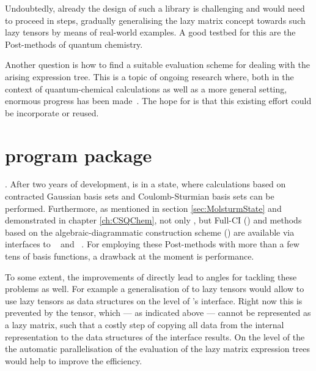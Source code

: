 Undoubtedly, already the design of such a library is challenging
and would need to proceed in steps,
gradually generalising the lazy matrix concept towards
such lazy tensors
by means of real-world examples.
A good testbed for this are the Post-\HF methods of quantum chemistry.

Another question is how to find a suitable evaluation
scheme for dealing with the arising expression tree.
This is a topic of ongoing research
where, both in the context of quantum-chemical calculations
as well as a more general setting,
enormous progress has been made~\cite{Baumgartner2005,Solomonik2014,%
Peise2015,Calvin2015,Calvin2015arxiv,Xerus,Kristensen2016array,%
Kristensen2016streaming,Libtensor}.
The hope for \lazyten is that this existing effort
could be incorporate or reused.

\section{\molsturm program package}
\label{sec:newMolsturm}.
After two years of development,
\molsturm is in a state,
where calculations based on contracted Gaussian basis sets
and Coulomb-Sturmian basis sets can be performed.
Furthermore, as mentioned in section \vref{sec:MolsturmState}
and demonstrated in chapter \vref{ch:CSQChem},
not only \HF, but Full-CI (\FCI) and
methods based on the algebraic-diagrammatic construction scheme (\ADC)
are available
via interfaces to \pyscf~\cite{Sun2017} and \adcman~\cite{Wormit2014}.
For employing these Post-\HF methods
with more than a few tens of basis functions,
a drawback at the moment is performance.

To some extent, the improvements
of \lazyten directly lead to angles for tackling these problems as well.
For example a generalisation of \lazyten to lazy tensors
would allow to use lazy tensors as data structures on the level of \molsturm's interface.
Right now this is prevented by the \ERI tensor,
which --- as indicated above --- cannot be represented as a lazy matrix,
such that a costly step of copying all data from the internal
representation to the data structures of the interface results.
On the level of the \SCF the automatic parallelisation
of the evaluation of the lazy matrix expression trees
would help to improve the efficiency.


